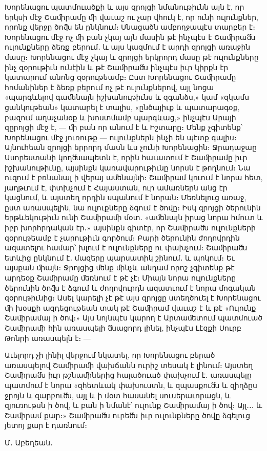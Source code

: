\documentclass{article}
\begin{document}
{Խորենացու պատմուածքի և այս զրոյցի նմանութիւնն այն է, որ երկսի մէջ Շաﬕրամը ﬕ վաւաշ ու չար վհուկ է, որ ունի ուլունքներ, որոնք վերջը ծոﬖ են ընկնում։ Սնացածն ամբողջապէս տարբեր է։ Խորենացու մէջ ոչ ﬕ բան չկայ այն մասին թէ ինչպէս է Շաﬕրաﬓ ուլունքները ձեռք բերում․ և այս կազմում է արդի զրոյցի առաջին մասը։ Խորենացու մէջ չկայ և զրոյցի երկրորդ մասը թէ ուլունքները ինչ զօրութիւն ունէին և թէ Շաﬕրաﬓ ինչպէս իւր կիրքն էր կատարում անոնց զօրութեամբ։ Ըստ Խորենացու Շաﬕրամը հոմանիներ է ձեռք բերում ոչ թէ ուլունքներով, այլ նոցա «պարգևելով գաﬔնայն իշխանութիւնս և զգանձս,» կամ «զկամս ցանկութեան» կատարել է տալիս, «ընծայիւք և պատարագօք, բազում աղաչանօք և խոստմամբ պարգևաց,» ինչպէս Արայի զըրոյցի մէջ է, — ﬕ բան որ անում է և Իշտարը։ Մենք չգիտենք՝ Խորենացու մէջ յուռութք — ուլունքներն ինչի են պէտք գալիս։ Այնուհեան զրոյցի երրորդ մասն ևս չունի Խորենացին։ Ջրադաջաը Ասորեստանի կողﬓապետն է, որին հաւատում է Շաﬕրամը իւր իշխանութիւնը, այսինքն կառավարութիւնը նորսն է թողնում։ Նա ուզում է բռնանալ ի վերայ աﬔնայնի։ Շաﬕրամ կռւում է նորա հետ, յաղթւում է, փտխչում է Հայաստան, ուր ամառներն անց էր կացնում, և այստեղ որդին սպանում է նորան։ Մեռնելուց առաջ, ըստ առասպելին, նա ուլուքները ձգում է ծովը։ Իսկ զրոյցի ծերունին երթևեկութիւն ունի Շաﬕրաﬕ մօտ․ «աﬔնայն իրաց նորա հմուտ և իբր խորհրդական էր․» այսինքն գիտէր, որ Շաﬕրաﬓ ուլունքների զօրութեամբ է չարութիւն գործում։ Բարի ծերունին ժողովրդին ազատելու համար՝ խլում է ուլունքները ու փախչում։ Շաﬕրաﬓ ետևից ընկնում է․ մազերը պարսատիկ շինում․ և պոկում։ Եւ այսքան ﬕայն։ Ջրոյցից ﬔնք ﬕնչև անդամ որոշ չգիտենք թէ արդեօք Շաﬕրամը ﬔռնում է թէ չէ։ Միայն նորա ուլունքները ծերունին ծոﬖ է ձգում և ժողովուրդն ազատւում է նորա մոգական զօրութիւնից։ Ասել կարելի չէ թէ այս զրոյցը ստեղծուել է Խորենացու ﬕ խօսքի ազդեցութեան տակ թէ Շաﬕրամ վաւաշ է և թէ «Ուլունք Շաﬕրամայ ի ծով։» Այս նոյնպէս կարող է Արտաﬔտում պատմուած Շաﬕրաﬕ հին առասպելի ﬓացորդ լինել, ինչպէս Լէզքի Սուրբ Թոնրի առասպելն է։ —

Աւելորդ չի լինիլ վերջում նկատել, որ Խորենացու բերած առասպելով Շաﬕրաﬕ վախճանն ուրիշ տեսակ է լինում։ Այստեղ Շաﬕրաﬓ իւր թշնաﬕներից հալածուած փախչում է․ առասպելը պատմում է նորա «զհետևակ փախուստն, և զպասքուﬓ և զիղձըս ջրոյն և զարբուﬓ, այլ և ի մօտ հասանել սուսերաւորացն, և զյուռութսն ի ծով, և բան ի նմանէ՝ ուլունք Շաﬕրամայ ի ծով։ Այլ․․․ և Շաﬕրամ քար։» Շաﬕրաﬓ ուրեﬓ իւր ուլունքները ծովը ձգելուց յետոյ քար է դառնում։

\bigskip

Մ․ Աբեղեան․}
\clearpage
\end{document}
